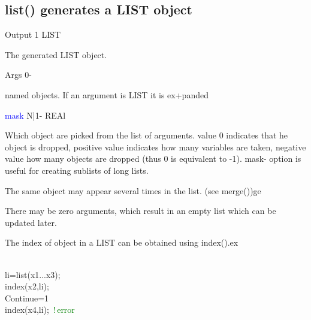 \subsection{\textcolor{VioletRed}{list}() generates a LIST object}
\label{list}
\vspace{0.3cm}
\hline
\vspace{0.3cm}
\noindent Output \tabto{3cm}  1 \tabto{5cm}   LIST  \tabto{7cm}
\begin{changemargin}{3cm}{0cm}
\noindent The generated LIST object.
\end{changemargin}
\vspace{0.3cm}
\hline
\vspace{0.3cm}
\noindent Args \tabto{3cm}  0-  \tabto{5cm}     \tabto{7cm}
\begin{changemargin}{3cm}{0cm}
\noindent  named objects. If an argument is LIST it is ex+panded
\end{changemargin}
\vspace{0.3cm}
\hline
\vspace{0.3cm}
\noindent \textcolor{blue}{mask} \tabto{3cm}  N|1-  \tabto{5cm}  REAl \tabto{7cm}
\begin{changemargin}{3cm}{0cm}
\noindent  Which object are picked from the list of arguments.\ta
value 0 indicates that
he object is dropped, positive value indicates how many variables are taken,
negative value how many objects are dropped (thus 0 is equivalent to -1). mask-
option is useful for creating sublists of long lists.
\end {changemargin}
\hline
\vspace{0.2cm}
\begin{note}
The same object may appear several times in the list. (see \textcolor{VioletRed}{merge}())ge
\end{note}
\begin{note}
There may be zero arguments, which result in an empty list
which can be updated later.
\end{note}
\begin{note}
The index of object in a LIST can be obtained using \textcolor{VioletRed}{index}().ex
\end{note}
\\
li=\textcolor{VioletRed}{list}(x1...x3);
\\
\textcolor{VioletRed}{index}(x2,li);
\\
Continue=1
\\
\textcolor{VioletRed}{index}(x4,li); \,\textcolor{green}{!\,error}
\\
